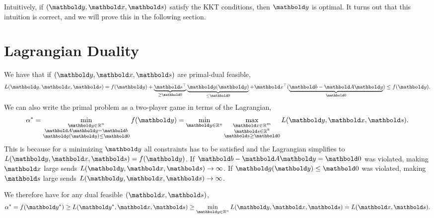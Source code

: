 Intuitively, if $(\vy, \vx, \vs)$ satisfy the KKT conditions, then $\vy$ is optimal. It turns out that this intuition is correct, and we will prove this in the following section.

\section{Lagrangian Duality}

We have that if $(\vy, \vx, \vs)$ are primal-dual feasible, \begin{align}
    L(\vy, \vx, \vs) = f(\vy) + \underbrace{\trans{\vs}}_{\geq \vZero}\underbrace{\vg(\vy)}_{\leq \vZero} + \trans{\vx}(\underbrace{\vb - \mA\vy}_{\vZero}) \leq f(\vy).
\end{align} We can also write the primal problem as a two-player game in terms of the Lagrangian, \begin{align}
    \s{\alpha} = \min_{\substack{\vy \in \R^n \\ \mA\vy = \vb \\ \vg(\vy) \leq \vZero}} f(\vy) = \min_{\vy \in \R^n} \max_{\substack{\vx \in \R^m \\ \vs \in \R^k \\ \vs \geq \vZero}} L(\vy, \vx, \vs).
\end{align} This is because for a minimizing $\vy$ all constraints has to be satisfied and the Lagrangian simplifies to $L(\vy, \vx, \vs) = f(\vy)$. If $\vb - \mA\vy = \vZero$ was violated, making $\vx$ large sends $L(\vy, \vx, \vs) \to \infty$. If $\vg(\vy) \leq \vZero$ was violated, making $\vs$ large sends $L(\vy, \vx, \vs) \to \infty$.

We therefore have for any dual feasible $(\vx, \vs)$, \begin{align}
    \s{\alpha} = f(\s{\vy}) \geq L(\s{\vy}, \vx, \vs) \geq \min_{\vy \in \R^n} L(\vy, \vx, \vs) \eqdef L(\vx, \vs). \label{eq:weak_duality}
\end{align}

